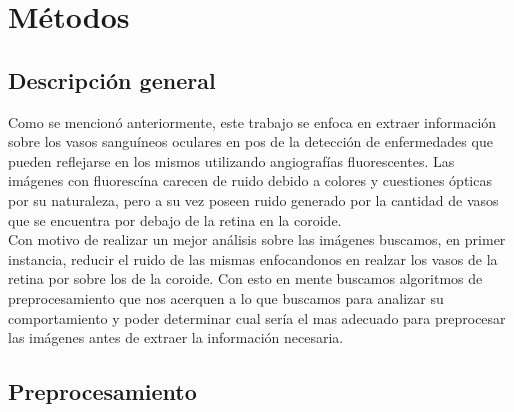 
\chapter{M\'etodos} %

\label{Chapter3} %


\section{Descripci\'on general}

Como se mencion\'o anteriormente, este trabajo se enfoca en extraer informaci\'on sobre los vasos sangu\'ineos oculares en pos de la detecci\'on de enfermedades que pueden reflejarse en los mismos utilizando angiograf\'ias fluorescentes.
Las im\'agenes con fluoresc\'ina carecen de ruido debido a colores y cuestiones \'opticas por su naturaleza, pero a su vez poseen ruido generado por la cantidad de vasos que se encuentra por debajo de la retina en la coroide.\\
Con motivo de realizar un mejor an\'alisis sobre las im\'agenes buscamos, en primer instancia, reducir el ruido de las mismas enfocandonos en realzar los vasos de la retina por sobre los de la coroide. Con esto en mente buscamos algoritmos de preprocesamiento que nos acerquen a lo que buscamos para analizar su comportamiento y poder determinar cual ser\'ia el mas adecuado para preprocesar las im\'agenes antes de extraer la informaci\'on necesaria.

\section{Preprocesamiento}
